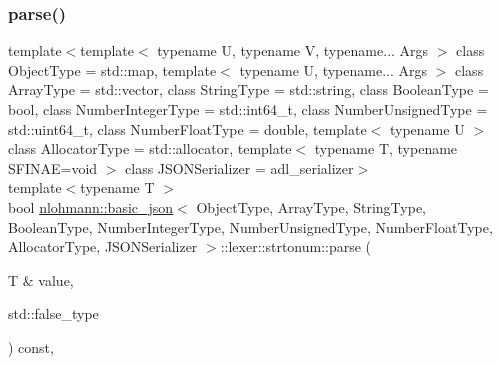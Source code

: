 \subsubsection{\texorpdfstring{parse()}{parse()}\hspace{0.1cm}{\footnotesize\ttfamily [1/2]}}
{\footnotesize\ttfamily template$<$template$<$ typename U, typename V, typename... Args $>$ class Object\+Type = std\+::map, template$<$ typename U, typename... Args $>$ class Array\+Type = std\+::vector, class String\+Type  = std\+::string, class Boolean\+Type  = bool, class Number\+Integer\+Type  = std\+::int64\+\_\+t, class Number\+Unsigned\+Type  = std\+::uint64\+\_\+t, class Number\+Float\+Type  = double, template$<$ typename U $>$ class Allocator\+Type = std\+::allocator, template$<$ typename T, typename S\+F\+I\+N\+A\+E=void $>$ class J\+S\+O\+N\+Serializer = adl\+\_\+serializer$>$ \\
template$<$typename T $>$ \\
bool \hyperlink{classnlohmann_1_1basic__json}{nlohmann\+::basic\+\_\+json}$<$ Object\+Type, Array\+Type, String\+Type, Boolean\+Type, Number\+Integer\+Type, Number\+Unsigned\+Type, Number\+Float\+Type, Allocator\+Type, J\+S\+O\+N\+Serializer $>$\+::lexer\+::strtonum\+::parse (\begin{DoxyParamCaption}\item[{T \&}]{value,  }\item[{std\+::false\+\_\+type}]{ }\end{DoxyParamCaption}) const\hspace{0.3cm}{\ttfamily [inline]}, {\ttfamily [private]}}

\mbox{\label{structnlohmann_1_1basic__json_1_1lexer_1_1strtonum_a3f225f7e285eda15af4fd1a6754b6fe7}} 
